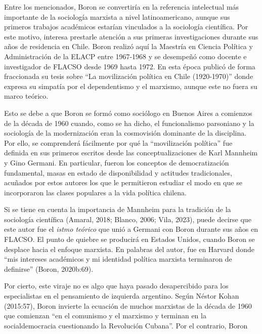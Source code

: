 Entre los mencionados, Boron se convertiría en la referencia intelectual más importante de la sociología marxista a nivel latinoamericano, aunque sus primeros trabajos académicos estarían vinculados a la sociología científica. Por este motivo, interesa prestarle atención a sus primeras investigaciones durante sus años de residencia en Chile. Boron realizó aquí la Maestría en Ciencia Política y Administración de la ELACP entre 1967-1968 y se desempeñó como docente e investigador de FLACSO desde 1969 hasta 1972. En esta época publicó de forma fraccionada su tesis sobre ``La movilización política en Chile (1920-1970)'' donde expresa su simpatía por el dependentismo y el marxismo, aunque este no fuera su marco teórico.

Esto se debe a que Boron se formó como sociólogo en Buenos Aires a comienzos de la década de 1960 cuando, como se ha dicho, el funcionalismo parsoniano y la sociología de la modernización eran la cosmovisión dominante de la disciplina. Por ello, se comprenderá fácilmente por qué la ``movilización política'' fue definida en sus primeros escritos desde las conceptualizaciones de Karl Mannheim y Gino Germani. En particular, fueron los conceptos de democratización fundamental, masas en estado de disponibilidad y actitudes tradicionales, acuñados por estos autores los que le permitieron estudiar el modo en que se incorporaron las clases populares a la vida política chilena.

Si se tiene en cuenta la importancia de Mannheim para la tradición de la sociología científica (Amaral, 2018; Blanco, 2006; Vila, 2023), puede decirse que este autor fue el \emph{istmo teórico} que unió a Germani con Boron durante sus años en FLACSO. El punto de quiebre se producirá en Estados Unidos, cuando Boron se desplace hacia el enfoque marxista. En palabras del autor, fue en Harvard donde ``mis intereses académicos y mi identidad política marxista terminaron de definirse'' (Boron, 2020b:69).

Por cierto, este viraje no es algo que haya pasado desapercibido para los especialistas en el pensamiento de izquierda argentino. Según Néstor Kohan (2015:57), Boron invierte la ecuación de muchos marxistas de la década de 1960 que comienzan ``en el comunismo y el marxismo y terminan en la socialdemocracia cuestionando la Revolución Cubana''. Por el contrario, Boron

